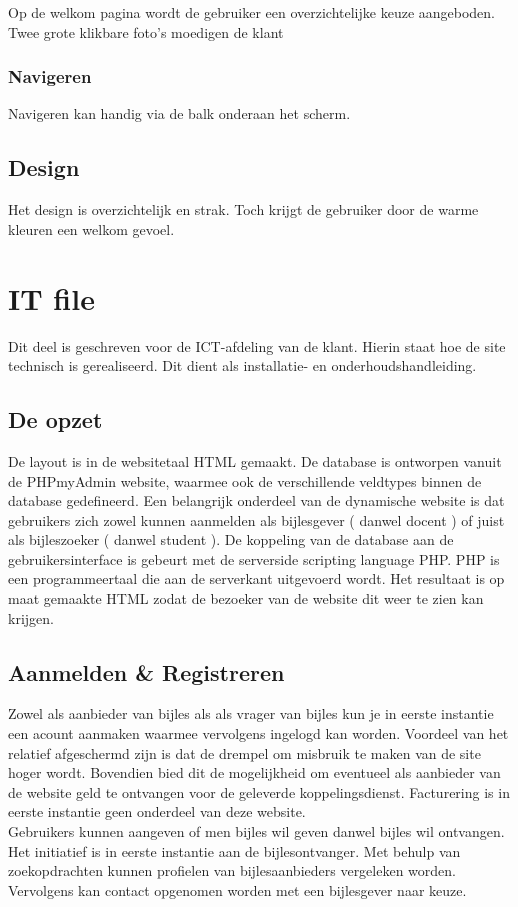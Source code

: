 \documentclass{report}
\begin{document}
            Op de welkom pagina wordt de gebruiker een overzichtelijke keuze aangeboden. Twee grote klikbare foto's moedigen de klant 
        
            \subsection{Navigeren}
                Navigeren kan handig via de balk onderaan het scherm. 
        
        \section{Design}
            Het design is overzichtelijk en strak. Toch krijgt de gebruiker door de warme kleuren een welkom gevoel.

    \chapter{IT file}
        Dit deel is geschreven voor de ICT-afdeling van de klant. Hierin staat hoe de site technisch is gerealiseerd. Dit dient als installatie- en onderhoudshandleiding.
        
        \section{De opzet}
            De layout is in de websitetaal HTML gemaakt. De database is ontworpen vanuit de PHPmyAdmin
    website, waarmee ook de verschillende veldtypes binnen de database gedefineerd. Een belangrijk onderdeel van de dynamische website is dat gebruikers zich zowel kunnen aanmelden als bijlesgever ( danwel docent ) of juist als bijleszoeker ( danwel student ). De koppeling van de database aan de gebruikersinterface is gebeurt met de serverside scripting language PHP. PHP is een programmeertaal die aan de serverkant uitgevoerd wordt. Het resultaat is op maat gemaakte HTML zodat de bezoeker van de website dit weer te zien kan krijgen.

        \section{Aanmelden \& Registreren}
            Zowel als aanbieder van bijles als als vrager van bijles kun je in eerste instantie een acount aanmaken waarmee vervolgens ingelogd kan worden. Voordeel van het relatief afgeschermd zijn is dat de drempel om misbruik te maken van de site hoger wordt. Bovendien bied dit de mogelijkheid om eventueel als aanbieder van de website geld te ontvangen voor de geleverde koppelingsdienst. Facturering is in eerste instantie geen onderdeel van deze website.\\
            Gebruikers kunnen aangeven of men bijles wil geven danwel bijles wil ontvangen. Het initiatief is in eerste instantie aan de bijlesontvanger. Met behulp van zoekopdrachten kunnen profielen van bijlesaanbieders vergeleken worden. Vervolgens kan contact opgenomen worden met een bijlesgever naar keuze. 
        
\end{document}
